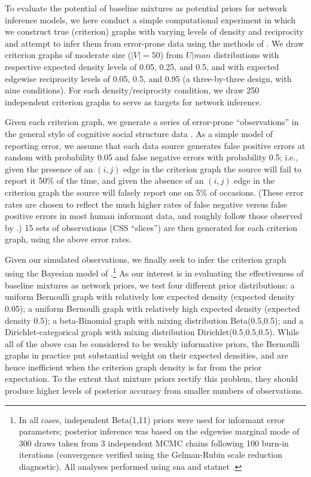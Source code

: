 \documentclass[11pt]{article}
\begin{document}
To evaluate the potential of baseline mixtures as potential priors for network inference models, we here conduct a simple computational experiment in which we construct true (criterion) graphs with varying levels of density and reciprocity and attempt to infer them from error-prone data using the methods of \citet{butts:sn:2003}.  We draw criterion graphs of moderate size ($|V|=50$) from $U|man$ distributions with respective expected density levels of 0.05, 0.25, and 0.5, and with expected edgewise reciprocity levels of 0.05, 0.5, and 0.95 (a three-by-three design, with nine conditions).  For each density/reciprocity condition, we draw 250 independent criterion graphs to serve as targets for network inference.

Given each criterion graph, we generate a series of error-prone ``observations'' in the general style of cognitive social structure data \citep[aka CSS data, see][]{krackhardt:sn:1987a}.  As a simple model of reporting error, we assume that each data source generates false positive errors at random with probability 0.05 and false negative errors with probability 0.5; i.e., given the presence of an $(i,j)$ edge in the criterion graph the source will fail to report it 50\% of the time, and given the absence of an $(i,j)$ edge in the criterion graph the source will falsely report one on 5\% of occasions.  (These error rates are chosen to reflect the much higher rates of false negative versus false positive errors in most human informant data, and roughly follow those observed by \citet{butts:sn:2003}.)  15 sets of observations (CSS ``slices'') are then generated for each criterion graph, using the above error rates.

Given our simulated observations, we finally seek to infer the criterion graph using the Bayesian model of \citet[section 2.5; i.e., multiple observers and general ERG priors]{butts:sn:2003}.\footnote{In all cases, independent Beta(1,11) priors were used for informant error parameters; posterior inference was based on the edgewise marginal mode of 300 draws taken from 3 independent MCMC chains following 100 burn-in iterations (convergence verified using the Gelman-Rubin scale reduction diagnostic).  All analyses performed using \textsf{sna} \citep{butts:jss:2008b} and \textsf{statnet} \citep{handcock.et.al:jss:2008}.}  As our interest is in evaluating the effectiveness of baseline mixtures as network priors, we test four different prior distributions: a uniform Bernoulli graph with relatively low expected density (expected density 0.05); a uniform Bernoulli graph with relatively high expected density (expected density 0.5); a beta-Binomial graph with mixing distribution Beta(0.5,0.5); and a Dirichlet-categorical graph with mixing distribution Dirichlet(0.5,0.5,0.5).  While all of the above can be considered to be weakly informative priors, the Bernoulli graphs in practice put substantial weight on their expected densities, and are hence inefficient when the criterion graph density is far from the prior expectation.  To the extent that mixture priors rectify this problem, they should produce higher levels of posterior accuracy from smaller numbers of observations.
\end{document}
